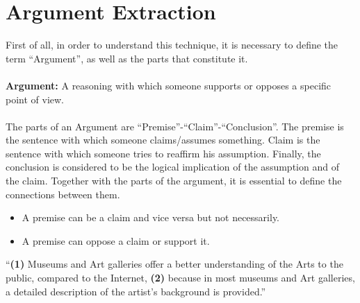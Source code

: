 \section{Argument Extraction}
First of all, in order to understand this technique, it is necessary to define the term ``Argument'', as well as the parts that constitute it.\\
\\
\textbf{Argument:} A reasoning with which someone supports or opposes a specific point of view.\\
\\
The parts of an Argument are ``Premise''-``Claim''-``Conclusion''. The premise is the sentence with which someone claims/assumes something. Claim is the sentence with which someone tries to reaffirm his assumption. Finally, the conclusion is considered to be the logical implication of the assumption and of the claim. Together with the parts of the argument, it is essential to define the connections between them. \cite{6}\cite{7}\\
\begin{itemize}

	\item A premise can be a claim and vice versa but not necessarily.
	\item A premise can oppose a claim or support it.\\

\end{itemize}

\begin{example}
``\textbf{(1)} Museums and Art galleries offer a better understanding of the Arts to the public, compared to the Internet, \textbf{(2)} because in most museums and Art galleries, a detailed description of the artist's background is provided.''\\
\end{example}


